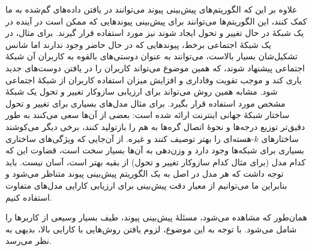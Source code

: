 علاوه بر این که الگوریتم‌های پیش‌بینی پیوند می‌توانند در یافتن داده‌های گم‌شده به ما کمک کنند، این الگوریتم‌ها می‌توانند برای پیش‌بینی پیوندهایی که ممکن است در آینده در یک شبکهٔ در حال تغییر و تحول ایجاد شوند نیز مورد استفاده قرار گیرند. برای مثال، در یک شبکهٔ اجتماعی برخط، پیوندهایی که در حال حاضر وجود ندارند اما شانس تشکیل‌شان بسیار بالاست، می‌توانند به عنوان دوستی‌های بالقوه به کاربران آن شبکهٔ اجتماعی پیشنهاد شوند، که همین موضوع می‌تواند کاربران را در یافتن دوست‌های جدید یاری کند و موجب تقویت وفاداری و افزایش میزان استفاده کاربران از شبکهٔ اجتماعی شود. مشابه همین روش می‌تواند برای ارزیابی سازوکار تغییر و تحول یک شبکهٔ مشخص مورد استفاده قرار بگیرد. برای مثال مدل‌های بسیاری برای تغییر و تحول ساختار شبکهٔ جهانی اینترنت ارائه شده است: بعضی از آن‌ها سعی می‌کنند به طور دقیق‌تر توزیع درجه‌ها و نحوهٔ اتصال گره‌ها به هم را بازتولید کنند\cite{zhou2004accurately}، برخی دیگر می‌کوشند ساختارهای $k$-هسته‌ای را بهتر توصیف کنند\cite{carmi2007model} و غیره. از آن‌جایی که ویژگی‌های ساختاری بسیاری برای شبکه‌ها وجود دارد و وزن‌دهی به آن‌ها بسیار سخت است، قضاوت این که کدام مدل (برای مثال کدام سازوکار تغییر و تحول) از بقیه بهتر است، آسان نیست. باید توجه داشت که هر مدل در اصل به یک الگوریتم پیش‌بینی پیوند متناظر می‌شود و بنابراین ما می‌توانیم از معیار دقت پیش‌بینی برای ارزیابی کارایی مدل‌های متفاوت استفاده کنیم.

همان‌طور که مشاهده می‌شود، مسئلهٔ پیش‌بینی پیوند، طیف بسیار وسیعی از کاربرها را شامل می‌شود. با توجه به این موضوع، لزوم یافتن روش‌هایی با کارایی بالا، بدیهی به نظر می‌رسد.
